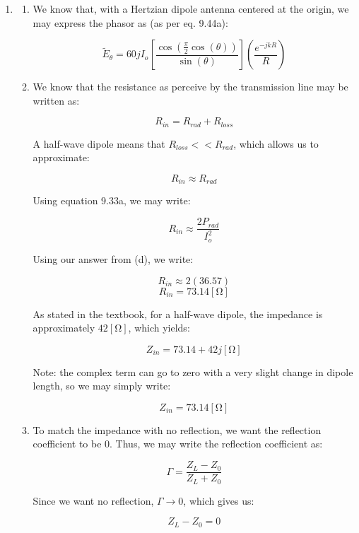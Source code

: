 \begin{enumerate}

  \item 

    \begin{enumerate}

      \item 

        We know that, with a Hertzian dipole antenna centered at the origin, we may express the phasor as (as per eq. 9.44a):

        $$\boxed{\tilde{E}_\theta=60jI_o\left[ \frac{\cos\left( \frac{\pi}{2}\cos(\theta) \right)}{\sin(\theta)} \right]\left( \frac{e^{-jkR}}{R} \right)}$$

      \item 

        We know that the resistance as perceive by the transmission line may be written as:

        $$R_{in}=R_{rad}+R_{loss}$$

        A half-wave dipole means that $R_{loss}<<R_{rad}$, which allows us to approximate:

        $$R_{in}\approx R_{rad}$$

        Using equation 9.33a, we may write:

        $$R_{in}\approx\frac{2P_{rad}}{I_o^2}$$

        Using our answer from (d), we write:

        $$R_{in}\approx 2(36.57)$$
        $$R_{in}=73.14[\si{\ohm}]$$

        As stated in the textbook, for a half-wave dipole, the impedance is approximately $42[\si{\ohm}]$, which yields:

        $$\boxed{Z_{in}=73.14+42j[\si{\ohm}]}$$

        Note: the complex term can go to zero with a very slight change in dipole length, so we may simply write:

        $$\boxed{Z_{in}=73.14[\si{\ohm}]}$$

      \item 

        To match the impedance with no reflection, we want the reflection coefficient to be 0. Thus, we may write the reflection coefficient as:

        $$\Gamma=\frac{Z_L-Z_0}{Z_L+Z_0}$$

        Since we want no reflection, $\Gamma\to0$, which gives us:

        $$Z_L-Z_0=0$$


\end{enumerate}
\end{enumerate}
